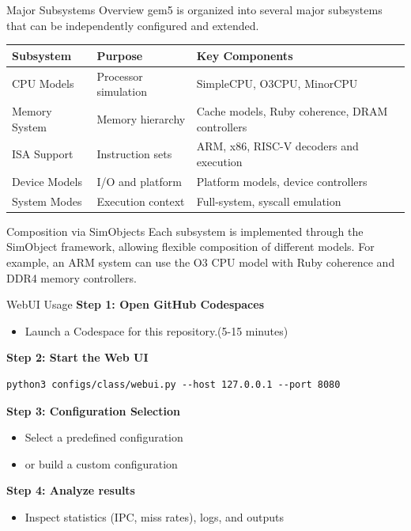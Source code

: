 \documentclass[aspectratio=169]{beamer}
\begin{document}
\begin{frame}{Major Subsystems Overview}
\small
gem5 is organized into several major subsystems that can be independently configured and extended.
\medskip

\begin{table}
  \centering
  \scriptsize
  \begin{tabular}{@{}lll@{}}
    \toprule
    Subsystem & Purpose & Key Components \\
    \midrule
    CPU Models & Processor simulation & SimpleCPU, O3CPU, MinorCPU \\
    Memory System & Memory hierarchy & Cache models, Ruby coherence, DRAM controllers \\
    ISA Support & Instruction sets & ARM, x86, RISC-V decoders and execution \\
    Device Models & I/O and platform & Platform models, device controllers \\
    System Modes & Execution context & Full-system, syscall emulation \\
    \bottomrule
  \end{tabular}
\end{table}

\begin{block}{Composition via SimObjects}
Each subsystem is implemented through the SimObject framework, allowing flexible composition of different models. For example, an ARM system can use the O3 CPU model with Ruby coherence and DDR4 memory controllers.
\end{block}
\end{frame}

\begin{frame}[fragile]{WebUI Usage}
\textbf{Step 1: Open GitHub Codespaces}
\begin{itemize}
  \item Launch a Codespace for this repository.(5-15 minutes)
\end{itemize}
\textbf{Step 2: Start the Web UI}
\begin{exampleblock}{}
\begin{verbatim}
python3 configs/class/webui.py --host 127.0.0.1 --port 8080
\end{verbatim}
\end{exampleblock}
\textbf{Step 3: Configuration Selection}
\begin{itemize}
  \item Select a predefined configuration
  \item or build a custom configuration
\end{itemize}
\textbf{Step 4: Analyze results}
\begin{itemize}
  \item Inspect statistics (IPC, miss rates), logs, and outputs
\end{itemize}
\end{frame}
\end{document}
